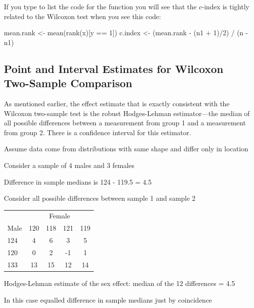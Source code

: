 If you type  to list the code for the function you will
see that the $c$-index is tightly related to the Wilcoxon test when
you see this code:
\begin{Schunk}
\begin{Sinput}
mean.rank <- mean(rank(x)[y == 1])
c.index <- (mean.rank - (n1 + 1)/2) / (n - n1)
\end{Sinput}
\end{Schunk}

\subsection{Point and Interval Estimates for Wilcoxon Two-Sample Comparison}
As mentioned earlier, the effect estimate that is exactly consistent
with the Wilcoxon two-sample test is the robust Hodges-Lehman estimator---the
median of all possible differences between a measurement from group 1
and a measurement from group 2.  There is a confidence interval for
this estimator.
\bi
\item Assume data come from distributions with same shape and differ only in location
\item Consider a sample of 4 males and 3 females
\item Difference in sample medians is 124 - 119.5 = 4.5
\item Consider all possible differences between sample 1 and sample 2
\ei
\begin{center}\begin{tabular}{l|cccc} \hline \hline \label{pg:nonpar-mf}
 & \multicolumn{4}{c}{Female} \\
Male & 120 & 118 & 121 & 119 \\ \hline
124 & 4 & 6 & 3 & 5 \\ 
120 & 0 & 2 & -1 & 1 \\
133 & 13 & 15 & 12 & 14 \\ \hline
\end{tabular}\end{center}
\bi
\item Hodges-Lehman estimate of the sex effect: median of the 12
  differences = 4.5
\item In this case equalled difference in sample medians just by coincidence
\ei
